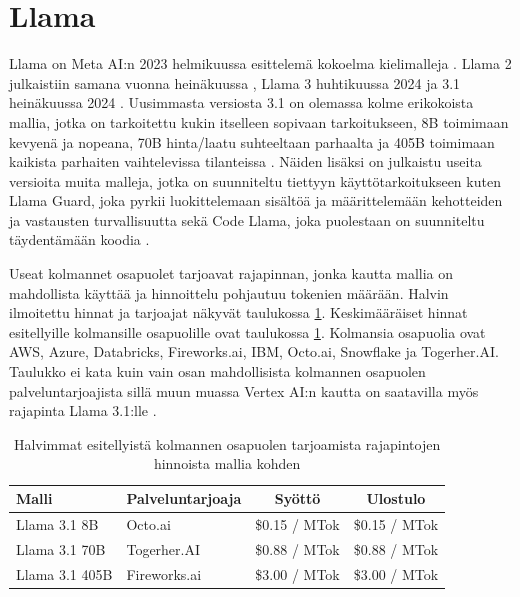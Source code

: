 \section{Llama}

Llama on Meta AI:n 2023 helmikuussa esittelemä kokoelma kielimalleja
\parencite{llama1}. Llama 2 julkaistiin samana vuonna heinäkuussa
\parencite{llama2}, Llama 3 huhtikuussa 2024 \parencite{llama3} ja 3.1
heinäkuussa 2024 \parencite{llama31}. Uusimmasta versiosta 3.1 on olemassa
kolme erikokoista mallia, jotka on tarkoitettu kukin itselleen sopivaan
tarkoitukseen, 8B toimimaan kevyenä ja nopeana, 70B hinta/laatu suhteeltaan
parhaalta ja 405B toimimaan kaikista parhaiten vaihtelevissa tilanteissa
\parencite{llama}. Näiden lisäksi on julkaistu useita versioita muita malleja,
jotka on suunniteltu tiettyyn käyttötarkoitukseen kuten Llama Guard, joka
pyrkii luokittelemaan sisältöä ja määrittelemään kehotteiden ja vastausten
turvallisuutta \parencite{llamaGuard3} sekä Code Llama, joka puolestaan on
suunniteltu täydentämään koodia \parencite{llamaOtherModels}.

Useat kolmannet osapuolet tarjoavat rajapinnan, jonka kautta mallia on
mahdollista käyttää ja hinnoittelu pohjautuu tokenien määrään. Halvin
ilmoitettu hinnat ja tarjoajat näkyvät taulukossa
\ref{tab:third-party-llama-prices}. Keskimääräiset hinnat esitellyille
kolmansille osapuolille ovat taulukossa \ref{tab:third-party-llama-prices}.
Kolmansia osapuolia ovat AWS, Azure, Databricks, Fireworks.ai, IBM, Octo.ai,
Snowflake ja Togerher.AI. \parencite{llama} Taulukko ei kata kuin vain osan
mahdollisista kolmannen osapuolen palveluntarjoajista sillä muun muassa
Vertex AI:n kautta on saatavilla myös rajapinta Llama 3.1:lle
\parencite{vertexAiModelGardenLlama3}.

\begin{table}[H]
  \centering
  \caption{Halvimmat esitellyistä kolmannen osapuolen tarjoamista rajapintojen hinnoista mallia kohden \parencite{llama}}
  \label{tab:third-party-llama-prices}
  \begin{tabular}{llcc}
    \textbf{Malli} & \textbf{Palveluntarjoaja} & \textbf{Syöttö} & \textbf{Ulostulo} \\
    \hline
    Llama 3.1 8B   & Octo.ai      & \$0.15 / MTok & \$0.15 / MTok \\
    Llama 3.1 70B  & Togerher.AI  & \$0.88 / MTok & \$0.88 / MTok \\
    Llama 3.1 405B & Fireworks.ai & \$3.00 / MTok & \$3.00 / MTok \\
    \hline
  \end{tabular}
\end{table}

